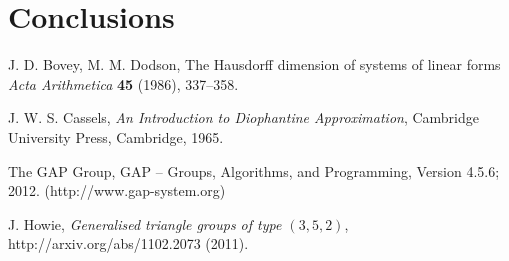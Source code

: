 \documentclass[12pt]{article}  %
\theoremstyle{definition}
\theoremstyle{remark}
\begin{document}
\section{Conclusions}\label{s:conc}



%
%
%
\begin{thebibliography}{99}

% 
%



%
J. D. Bovey, M. M. Dodson,                         %
The Hausdorff dimension of systems of linear forms %
{\em Acta Arithmetica}                             %
{\bf 45}                                           %
(1986), 337--358.                                   %

%
J. W. S. Cassels,                                  %
{\em An Introduction to Diophantine Approximation},%
Cambridge University Press, Cambridge, 1965.       %

%
The GAP Group, GAP -- Groups, Algorithms, and Programming,  %
Version 4.5.6; 2012. %
(http://www.gap-system.org)  %


%
J. Howie,                                            %
{\em Generalised triangle groups of type $(3,5,2)$}, %
http://arxiv.org/abs/1102.2073                       %
(2011).                                              %
\end{thebibliography}
\end{document}
